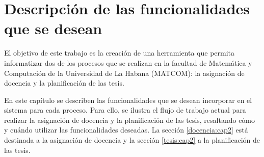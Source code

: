 \chapter{Descripción de las funcionalidades que se desean}\label{chapter:features}
El objetivo de este trabajo es la creación de una herramienta
que permita informatizar dos de los procesos que se realizan en la facultad de Matemática y
Computación de la Universidad de La Habana (MATCOM): la asignación de docencia y la planificación de las tesis. 

En este capítulo se describen las funcionalidades que se desean incorporar
en el sistema para cada proceso. 
Para ello, se ilustra el flujo de trabajo actual para 
realizar la asignación de docencia y la planificación de las tesis, resaltando 
cómo y cuándo utilizar las funcionalidades deseadas.
La sección \ref{docencia:cap2} está destinada a la asignación de docencia y 
la sección \ref{tesis:cap2} a la planificación de las tesis.












